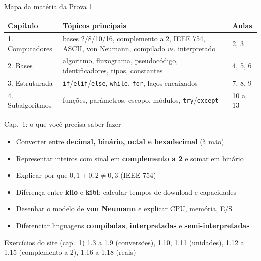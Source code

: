 \documentclass[aspectratio=169,10pt,t]{beamer}
\begin{document}
\capa

\begin{frame}{Mapa da matéria da Prova 1}
  \centering\small
  \begin{tabular}{p{2.6cm}p{6cm}l}
    \toprule
    \textbf{Capítulo} & \textbf{Tópicos principais} & \textbf{Aulas}\\
    \midrule
    1. Computadores & bases 2/8/10/16, complemento a 2, IEEE 754, ASCII, von Neumann, compilado \emph{vs.} interpretado & 2, 3\\
    2. Bases & algoritmo, fluxograma, pseudocódigo, identificadores, tipos, constantes & 4, 5, 6\\
    3. Estruturada & \texttt{if}/\texttt{elif}/\texttt{else}, \texttt{while}, \texttt{for}, laços encaixados & 7, 8, 9\\
    4. Subalgoritmos & funções, parâmetros, escopo, módulos, \texttt{try}/\texttt{except} & 10 a 13\\
    \bottomrule
  \end{tabular}
\end{frame}

\begin{frame}{Cap.~1: o que você precisa saber fazer}
  \begin{itemize}
    \item Converter entre \textbf{decimal, binário, octal e hexadecimal} (à mão)
    \item Representar inteiros com sinal em \textbf{complemento a 2} e somar em binário
    \item Explicar por que \(0{,}1+0{,}2\neq0{,}3\) (IEEE 754)
    \item Diferença entre \textbf{kilo} e \textbf{kibi}; calcular tempos de download e capacidades
    \item Desenhar o modelo de \textbf{von Neumann} e explicar CPU, memória, E/S
    \item Diferenciar linguagens \textbf{compiladas}, \textbf{interpretadas} e \textbf{semi-interpretadas}
  \end{itemize}
  \begin{exampleblock}{Exercícios do site (cap.~1)}
    1.3 a 1.9 (conversões), 1.10, 1.11 (unidades), 1.12 a 1.15 (complemento a 2), 1.16 a 1.18 (reais)
  \end{exampleblock}
\end{frame}
\end{document}
